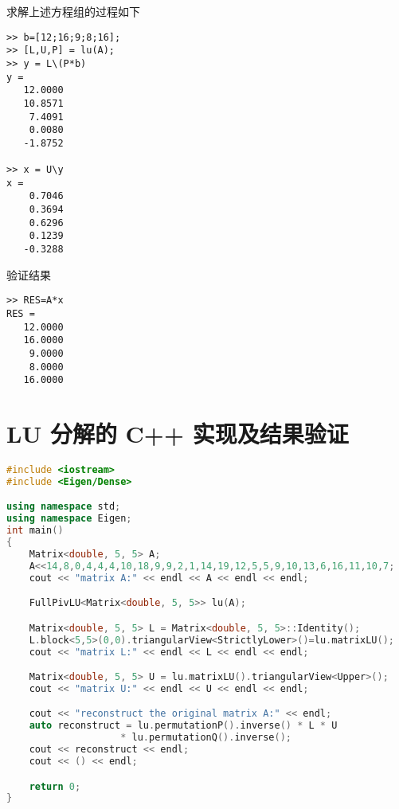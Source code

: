 求解上述方程组的过程如下
\begin{lstlisting}
>> b=[12;16;9;8;16];
>> [L,U,P] = lu(A);
>> y = L\(P*b)
y =
   12.0000
   10.8571
    7.4091
    0.0080
   -1.8752

>> x = U\y
x =
    0.7046
    0.3694
    0.6296
    0.1239
   -0.3288
\end{lstlisting}

验证结果
\begin{lstlisting}
>> RES=A*x
RES =
   12.0000
   16.0000
    9.0000
    8.0000
   16.0000
\end{lstlisting}


\section{LU 分解的 C++ 实现及结果验证}
\begin{lstlisting}[language=C++]
#include <iostream>
#include <Eigen/Dense>

using namespace std;
using namespace Eigen;
int main()
{
    Matrix<double, 5, 5> A;
    A<<14,8,0,4,4,4,10,18,9,9,2,1,14,19,12,5,5,9,10,13,6,16,11,10,7;
    cout << "matrix A:" << endl << A << endl << endl;

    FullPivLU<Matrix<double, 5, 5>> lu(A);

    Matrix<double, 5, 5> L = Matrix<double, 5, 5>::Identity();
    L.block<5,5>(0,0).triangularView<StrictlyLower>()=lu.matrixLU();
    cout << "matrix L:" << endl << L << endl << endl;

    Matrix<double, 5, 5> U = lu.matrixLU().triangularView<Upper>();
    cout << "matrix U:" << endl << U << endl << endl;

    cout << "reconstruct the original matrix A:" << endl;
    auto reconstruct = lu.permutationP().inverse() * L * U
                    * lu.permutationQ().inverse();
    cout << reconstruct << endl;
    cout << () << endl;

    return 0;
}
\end{lstlisting}

